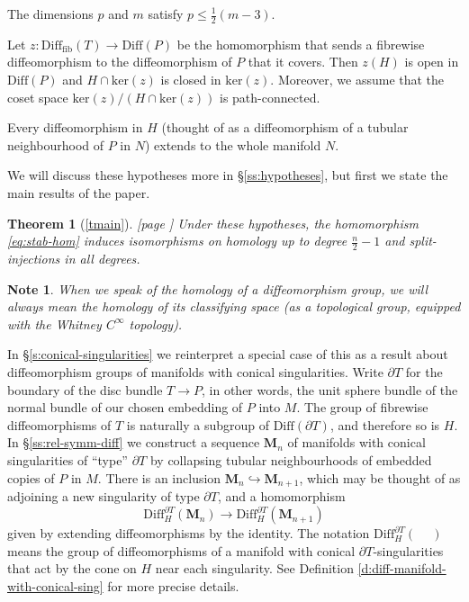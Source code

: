 \documentclass[reqno,a4paper]{article}
\numberwithin{equation}{section}
\theoremstyle{italicised}
\theoremstyle{upright}
\newtheorem*{note}{Note}
\theoremstyle{italicised-restate}
\newtheorem{rthm}{Theorem}
\newenvironment{itemizeb}%
{\begin{compactitem}
\renewcommand{\labelitemi}{\ensuremath{\bullet}}
\renewcommand{\labelitemii}{\ensuremath{\bullet}}}%
{\end{compactitem}}
\renewcommand{\leq}{\leqslant}
\begin{document}
\begin{itemizeb}
\item[(a)] The dimensions $p$ and $m$ satisfy $p \leq \tfrac12(m-3)$.
\item[(b)] Let $z \colon \mathrm{Diff}_{\mathrm{fib}}(T) \to \mathrm{Diff}(P)$ be the homomorphism that sends a fibrewise diffeomorphism to the diffeomorphism of $P$ that it covers. Then $z(H)$ is open in $\mathrm{Diff}(P)$ and $H \cap \mathrm{ker}(z)$ is closed in $\mathrm{ker}(z)$. Moreover, we assume that the coset space $\mathrm{ker}(z)/(H \cap \mathrm{ker}(z))$ is path-connected.
\item[(c)] Every diffeomorphism in $H$ (thought of as a diffeomorphism of a tubular neighbourhood of $P$ in $N$) extends to the whole manifold $N$.
\end{itemizeb}

We will discuss these hypotheses more in \S\ref{ss:hypotheses}, but first we state the main results of the paper.

\begin{rthm}[\ref{tmain}] \textup{[page \pageref{tmain}]}
Under these hypotheses, the homomorphism \eqref{eq:stab-hom} induces isomorphisms on homology up to degree $\tfrac{n}{2} - 1$ and split-injections in all degrees.
\end{rthm}

\begin{note}
When we speak of the \emph{homology} of a diffeomorphism group, we will always mean the homology of its classifying space (as a topological group, equipped with the Whitney $C^\infty$ topology).
\end{note}

In \S\ref{s:conical-singularities} we reinterpret a special case of this as a result about diffeomorphism groups of manifolds with conical singularities. Write $\partial T$ for the boundary of the disc bundle $T \to P$, in other words, the unit sphere bundle of the normal bundle of our chosen embedding of $P$ into $M$. The group of fibrewise diffeomorphisms of $T$ is naturally a subgroup of $\mathrm{Diff}(\partial T)$, and therefore so is $H$. In \S\ref{ss:rel-symm-diff} we construct a sequence $\mathbf{M}_n$ of manifolds with conical singularities of ``type'' $\partial T$ by collapsing tubular neighbourhoods of embedded copies of $P$ in $M$. There is an inclusion $\mathbf{M}_n \hookrightarrow \mathbf{M}_{n+1}$, which may be thought of as adjoining a new singularity of type $\partial T$, and a homomorphism
\begin{equation}\label{eq:stab-hom-sing}
\mathrm{Diff}_H^{\partial T}(\mathbf{M}_n) \longrightarrow \mathrm{Diff}_H^{\partial T}(\mathbf{M}_{n+1})
\end{equation}
given by extending diffeomorphisms by the identity. The notation $\mathrm{Diff}_H^{\partial T}(\phantom{-})$ means the group of diffeomorphisms of a manifold with conical $\partial T$-singularities that act by the cone on $H$ near each singularity. See Definition \ref{d:diff-manifold-with-conical-sing} for more precise details.
\end{document}
